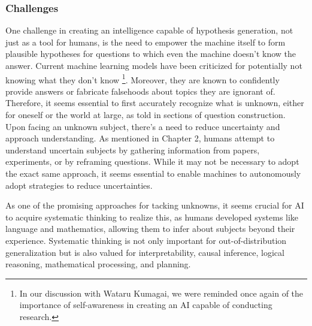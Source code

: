 \subsubsection{Challenges}
One challenge in creating an intelligence capable of hypothesis generation, not just as a tool for humans, is the need to empower the machine itself to form plausible hypotheses for questions to which even the machine doesn't know the answer. Current machine learning models have been criticized for potentially not knowing what they don't know \footnote{
In our discussion with Wataru Kumagai, we were reminded once again of the importance of self-awareness in creating an AI capable of conducting research.
}. 
Moreover, they are known to confidently provide answers or fabricate falsehoods about topics they are ignorant of. Therefore, it seems essential to first accurately recognize what is unknown, either for oneself or the world at large, as told in sections of question construction. Upon facing an unknown subject, there's a need to reduce uncertainty and approach understanding. As mentioned in Chapter 2, humans attempt to understand uncertain subjects by gathering information from papers, experiments, or by reframing questions. While it may not be necessary to adopt the exact same approach, it seems essential to enable machines to autonomously adopt strategies to reduce uncertainties.



As one of the promising approaches for tacking unknowns, it seems crucial for AI to acquire systematic thinking to realize this, as humans developed systems like language and mathematics, allowing them to infer about subjects beyond their experience. Systematic thinking is not only important for out-of-distribution generalization but is also valued for interpretability, causal inference, logical reasoning, mathematical processing, and planning.

